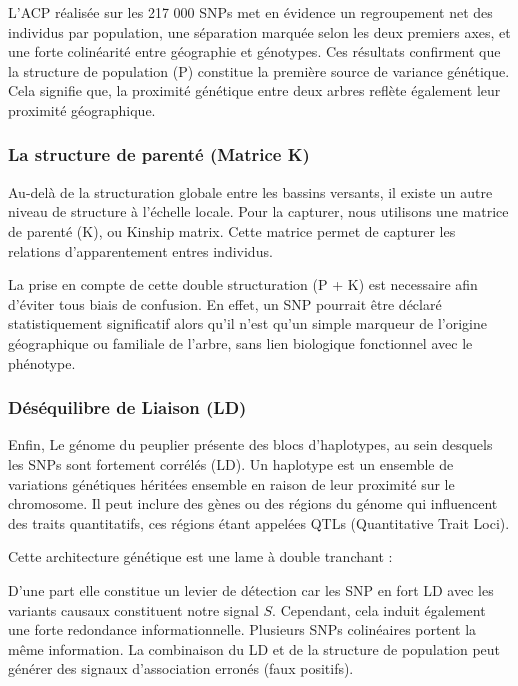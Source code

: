 \documentclass[
  11pt,
  letterpaper,
  DIV=11,
  numbers=noendperiod]{scrartcl}
\begin{document}
L'ACP réalisée sur les 217 000 SNPs met en évidence un regroupement net
des individus par population, une séparation marquée selon les deux
premiers axes, et une forte colinéarité entre géographie et génotypes.
Ces résultats confirment que la structure de population (P) constitue la
première source de variance génétique. Cela signifie que, la proximité
génétique entre deux arbres reflète également leur proximité
géographique.

\hypertarget{la-structure-de-parentuxe9-matrice-k}{%
\subsubsection{La structure de parenté (Matrice
K)}\label{la-structure-de-parentuxe9-matrice-k}}

Au-delà de la structuration globale entre les bassins versants, il
existe un autre niveau de structure à l'échelle locale. Pour la
capturer, nous utilisons une matrice de parenté (K), ou Kinship matrix.
Cette matrice permet de capturer les relations d'apparentement entres
individus.

La prise en compte de cette double structuration (P + K) est necessaire
afin d'éviter tous biais de confusion. En effet, un SNP pourrait être
déclaré statistiquement significatif alors qu'il n'est qu'un simple
marqueur de l'origine géographique ou familiale de l'arbre, sans lien
biologique fonctionnel avec le phénotype.

\hypertarget{duxe9suxe9quilibre-de-liaison-ld}{%
\subsubsection{Déséquilibre de Liaison
(LD)}\label{duxe9suxe9quilibre-de-liaison-ld}}

Enfin, Le génome du peuplier présente des blocs d'haplotypes, au sein
desquels les SNPs sont fortement corrélés (LD). Un haplotype est un
ensemble de variations génétiques héritées ensemble en raison de leur
proximité sur le chromosome. Il peut inclure des gènes ou des régions du
génome qui influencent des traits quantitatifs, ces régions étant
appelées QTLs (Quantitative Trait Loci).

Cette architecture génétique est une lame à double tranchant :

D'une part elle constitue un levier de détection car les SNP en fort LD
avec les variants causaux constituent notre signal \(S\). Cependant,
cela induit également une forte redondance informationnelle. Plusieurs
SNPs colinéaires portent la même information. La combinaison du LD et de
la structure de population peut générer des signaux d'association
erronés (faux positifs).
\end{document}
